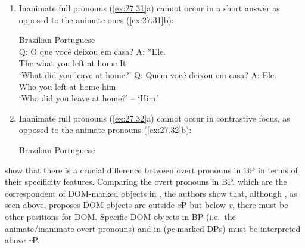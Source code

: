 \documentclass[output=paper]{langsci/langscibook}
\begin{document}
\begin{enumerate}[label=(\alph*)]
\item Inanimate full pronouns (\ref{ex:27.31}a) cannot occur
in a short answer as opposed to the animate ones (\ref{ex:27.31}b):

\ea\label{ex:27.31} Brazilian Portuguese\\
    \ea
        \gll Q:  O     que     você   deixou  em   casa?         A: *Ele.\\
        {}     The what   you     left    at      home {} \hphantom{*}It\\
        \glt \hphantom{Q: }`What did you leave at home?'
    \ex
        \gll Q:  Quem   você   deixou  em   casa?              A: Ele.\\
            {} Who     you     left       at     home          {} him\\
        \glt \hphantom{Q: }`Who did you leave at home?' -- `Him.'
    \z
\z

\item Inanimate full pronouns (\ref{ex:27.32}a) cannot  occur
in contrastive focus, as opposed to the animate pronouns (\ref{ex:27.32}b):

\ea\label{ex:27.32} Brazilian Portuguese\\
    \z
\z
\end{enumerate}\largerpage[2]

\noindent\textcite{IrimiaCyrino2015,IrimiaCyrino2017} show that there is a crucial
difference between overt pronouns in \gls{BP} in terms of their specificity features.
Comparing the overt pronouns in \gls{BP}, which are the correspondent of DOM-marked
objects in , the authors show that, although \textcite{Lopez2012}, as
seen above, proposes DOM objects are outside \emph{v}P but below \emph{v},
there must be other positions for DOM\@. Specific DOM-objects in \gls{BP} (i.e.\ the
animate/inanimate overt pronouns) and in  (\emph{pe}-marked DPs) must
be interpreted above \emph{v}P.
\end{document}
